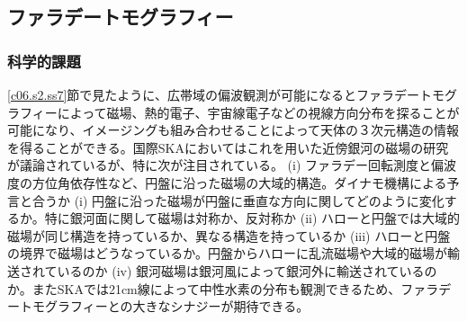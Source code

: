 \subsection{ファラデートモグラフィー}
\label{c06.s2.ss8}

\subsubsection{科学的課題}
\label{c06.s2.ss8.sss1}

\ref{c06.s2.ss7}節で見たように、広帯域の偏波観測が可能になるとファラデートモグラフィーによって磁場、熱的電子、宇宙線電子などの視線方向分布を探ることが可能になり、イメージングも組み合わせることによって天体の３次元構造の情報を得ることができる。国際SKAにおいてはこれを用いた近傍銀河の磁場の研究が議論されているが、特に次が注目されている。
(i) ファラデー回転測度と偏波度の方位角依存性など、円盤に沿った磁場の大域的構造。ダイナモ機構による予言と合うか (i) 円盤に沿った磁場が円盤に垂直な方向に関してどのように変化するか。特に銀河面に関して磁場は対称か、反対称か (ii) ハローと円盤では大域的磁場が同じ構造を持っているか、異なる構造を持っているか (iii) ハローと円盤の境界で磁場はどうなっているか。円盤からハローに乱流磁場や大域的磁場が輸送されているのか (iv) 銀河磁場は銀河風によって銀河外に輸送されているのか。またSKAでは21cm線によって中性水素の分布も観測できるため、ファラデートモグラフィーとの大きなシナジーが期待できる。
